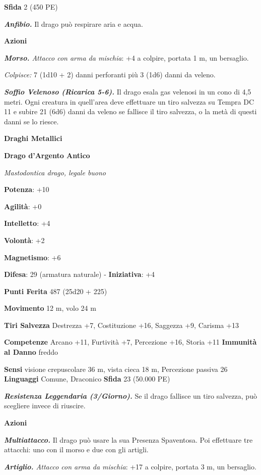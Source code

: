 \begin{multicols}{2}
\textbf{Sfida} 2 (450 PE)\smallskip

\emph{\textbf{Anfibio.}} Il drago può respirare aria e acqua.

\smallskip\textbf{Azioni}

\emph{\textbf{Morso.} Attacco con arma da mischia}: +4 a colpire,
portata 1 m, un bersaglio.

\emph{Colpisce:} 7 (1d10 + 2) danni perforanti più 3 (1d6) danni da
veleno.

\emph{\textbf{Soffio Velenoso (Ricarica 5-6).}} Il drago esala gas
velenosi in un cono di 4,5 metri. Ogni creatura in quell'area deve
effettuare un tiro salvezza su Tempra DC 11 e subire 21 (6d6)
danni da veleno se fallisce il tiro salvezza, o la metà di questi danni
se lo riesce.

\textbf{Draghi Metallici}

\textbf{Drago d'Argento Antico}

\emph{Mastodontica drago, legale buono}

\textbf{Potenza}: +10

\textbf{Agilità}: +0

\textbf{Intelletto}: +4

\textbf{Volontà}: +2

\textbf{Magnetismo}: +6

\textbf{Difesa}: 29 (armatura naturale) - \textbf{Iniziativa}: +4

\textbf{Punti Ferita} 487 (25d20 + 225) 

\textbf{Movimento} 12 m, volo 24 m

\textbf{Tiri Salvezza} Destrezza +7, Costituzione +16, Saggezza +9,
Carisma +13

\textbf{Competenze} Arcano +11, Furtività +7, Percezione +16, Storia +11
\textbf{Immunità al Danno} freddo

\textbf{Sensi} visione crepuscolare 36 m, vista cieca 18 m, Percezione passiva
26 \textbf{Linguaggi} Comune, Draconico \textbf{Sfida} 23 (50.000 PE)\smallskip

\emph{\textbf{Resistenza Leggendaria (3/Giorno).}} Se il drago fallisce
un tiro salvezza, può scegliere invece di riuscire.

\smallskip\textbf{Azioni}

\emph{\textbf{Multiattacco.}} Il drago può usare la sua Presenza
Spaventosa. Poi effettuare tre attacchi: uno con il morso e due con gli
artigli.

\emph{\textbf{Artiglio.} Attacco con arma da mischia}: +17 a colpire,
portata 3 m, un bersaglio.


\end{multicols}
